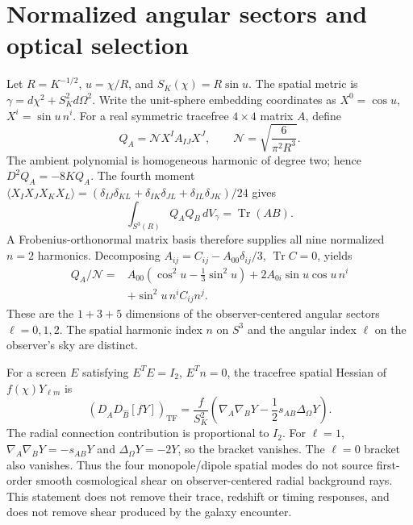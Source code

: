 \section{Normalized angular sectors and optical selection}
\label{sec:angular-selection}

Let $R=K^{-1/2}$, $u=\chi/R$, and
$S_K(\chi)=R\sin u$.  The spatial metric is
$\gamma=d\chi^2+S_K^2d\Omega^2$.
Write the unit-sphere embedding coordinates as
$X^0=\cos u$, $X^i=\sin u\,n^i$.
For a real symmetric tracefree $4\times4$ matrix $A$, define
\begin{equation}
 Q_A=\mathcal N X^I A_{IJ}X^J,
 \qquad \mathcal N=\sqrt{\frac{6}{\pi^2R^3}}.
 \label{eq:normalized-harmonic}
\end{equation}
The ambient polynomial is homogeneous harmonic of degree two; hence
$D^2Q_A=-8KQ_A$.  The fourth moment
$\langle X_I X_J X_K X_L\rangle=
(\delta_{IJ}\delta_{KL}+\delta_{IK}\delta_{JL}
+\delta_{IL}\delta_{JK})/24$ gives
\begin{equation}
 \int_{S^3(R)}Q_AQ_B\,dV_\gamma=\operatorname{Tr}(AB).
 \label{eq:harmonic-normalization}
\end{equation}
A Frobenius-orthonormal matrix basis therefore supplies all nine normalized
$n=2$ harmonics.  Decomposing
$A_{ij}=C_{ij}-A_{00}\delta_{ij}/3$, $\operatorname{Tr}C=0$, yields
\begin{align}
 Q_A/\mathcal N={}&A_{00}(\cos^2u-\tfrac13\sin^2u)
 +2A_{0i}\sin u\cos u\,n^i\nonumber\\
 &+\sin^2u\,n^iC_{ij}n^j.
 \label{eq:angular-decomposition}
\end{align}
These are the $1+3+5$ dimensions of the observer-centered angular sectors
$\ell=0,1,2$.  The spatial harmonic index $n$ on $S^3$ and the angular
index $\ell$ on the observer's sky are distinct.

For a screen $E$ satisfying $E^TE=I_2$, $E^Tn=0$, the tracefree spatial
Hessian of $f(\chi)Y_{\ell m}$ is
\begin{equation}
 (D_{\hat A}D_{\hat B}[fY])_{\mathrm{TF}}
 =\frac{f}{S_K^2}
 \left(\nabla_A\nabla_BY-\frac12s_{AB}\Delta_\Omega Y\right).
 \label{eq:screen-hessian}
\end{equation}
The radial connection contribution is proportional to $I_2$.
For $\ell=1$, $\nabla_A\nabla_BY=-s_{AB}Y$ and
$\Delta_\Omega Y=-2Y$, so the bracket vanishes.
The $\ell=0$ bracket also vanishes.  Thus the four monopole/dipole
spatial modes do not source first-order smooth cosmological shear on
observer-centered radial background rays.  This statement does not
remove their trace, redshift or timing responses, and does not remove
shear produced by the galaxy encounter.

